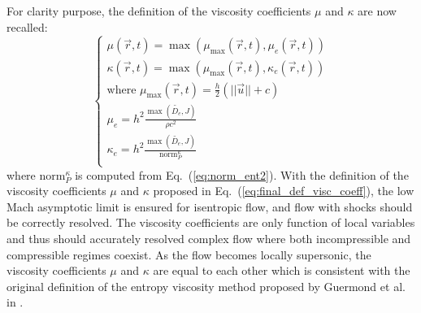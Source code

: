 \documentclass[preprint,10pt]{elsarticle}
\newcommand{\norm}{\textrm{norm}}
\renewcommand{\Re}{\textrm{Re\,}}
\newcommand{\eqt}[1]{Eq.~(\ref{#1})}                     %
\begin{document}

For clarity purpose, the definition of the viscosity coefficients $\mu$ and $\kappa$ are now recalled:
\begin{equation}
\label{eq:final_def_visc_coeff}
\left\{
\begin{array}{l}
\mu(\vec{r},t) = \max (\mu_{\max}(\vec{r},t), \mu_e (\vec{r},t)) \\
\kappa(\vec{r},t) = \max (\mu_{\max}(\vec{r},t), \kappa_e (\vec{r},t)) \\
\text{where } \mu_{\max}(\vec{r},t) = \frac{h}{2} (||\vec{u}|| + c) \\
\mu_{e} = h^2 \frac{\max(\tilde{D_e}, J)}{\rho c^2} \\
\kappa_{e} = h^2 \frac{\max(\tilde{D_e}, J)}{\norm_P^{\kappa}} \\
\end{array}
\right.
\end{equation}
where $\norm_P^{\kappa}$ is computed from \eqt{eq:norm_ent2}. With the definition of the viscosity coefficients $\mu$ and $\kappa$ proposed in \eqt{eq:final_def_visc_coeff}, the low Mach asymptotic limit is ensured for isentropic flow, and flow with shocks should be correctly resolved. The viscosity coefficients are only function of local variables and thus should accurately resolved complex flow where both incompressible and compressible regimes coexist. As the flow becomes locally supersonic, the viscosity coefficients $\mu$ and $\kappa$ are equal to each other which is consistent with the original definition of the entropy viscosity method proposed by Guermond et al. in \cite{jlg1, jlg2}.
\end{document}
